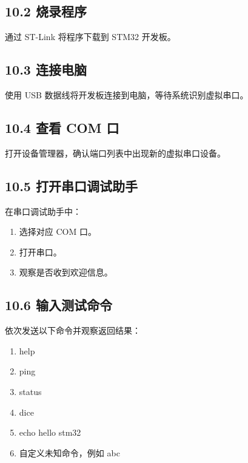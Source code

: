 \documentclass[
  chinese,
  UTF8,
  oneside,
  openany]{ctexbook}
\providecommand{\tightlist}{%
  \setlength{\itemsep}{0pt}\setlength{\parskip}{0pt}}
\begin{document}
\subsection{10.2 烧录程序}\label{ux70e7ux5f55ux7a0bux5e8f}

通过 ST-Link 将程序下载到 STM32 开发板。

\subsection{10.3 连接电脑}\label{ux8fdeux63a5ux7535ux8111}

使用 USB 数据线将开发板连接到电脑，等待系统识别虚拟串口。

\subsection{10.4 查看 COM 口}\label{ux67e5ux770b-com-ux53e3}

打开设备管理器，确认端口列表中出现新的虚拟串口设备。

\subsection{10.5
打开串口调试助手}\label{ux6253ux5f00ux4e32ux53e3ux8c03ux8bd5ux52a9ux624b}

在串口调试助手中：

\begin{enumerate}
\def\labelenumi{\arabic{enumi}.}
\tightlist
\item
  选择对应 COM 口。
\item
  打开串口。
\item
  观察是否收到欢迎信息。
\end{enumerate}

\subsection{10.6
输入测试命令}\label{ux8f93ux5165ux6d4bux8bd5ux547dux4ee4}

依次发送以下命令并观察返回结果：

\begin{enumerate}
\def\labelenumi{\arabic{enumi}.}
\tightlist
\item
  help
\item
  ping
\item
  status
\item
  dice
\item
  echo hello stm32
\item
  自定义未知命令，例如 abc
\end{enumerate}
\end{document}
